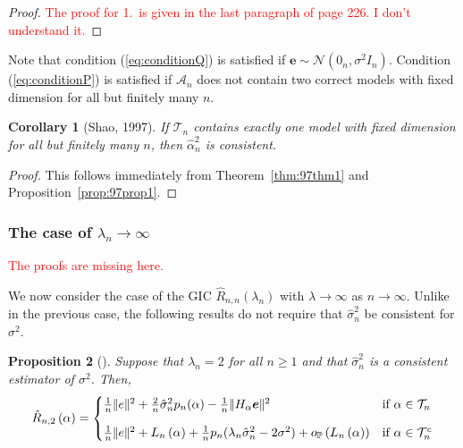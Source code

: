 \documentclass[12pt, letter paper]{article}
\newcommand{\1}{\mathmybb{1}}
\newtheorem{proposition}{Proposition}[section]
\newtheorem{corollary}[proposition]{Corollary}
\newcommand{\0}{\emptyset}
\newcommand{\prob}{\mathbb{P}}
\newcommand{\paren}[1]{\left(#1 \right)}
\newcommand{\norm}[1]{|\hspace{-1pt}|#1 |\hspace{-1pt}|}
\newcommand{\normsq}[1]{\norm{#1}^{2}}
\newcommand{\Acal}{\mathcal{A}_{n}}
\newcommand{\Tcal}{\mathcal{T}_{n}}
\newcommand{\Ncal}{\mathcal{N}}
\newcommand{\e}{\boldsymbol{e}}
\newcommand{\Loss}[1]{L_{n}\paren{#1}}
\newcommand{\Rhat}[2]{\hat{R}_{n, #1}\paren{#2}}
\newcommand{\alphahat}[1]{\hat{\alpha}^{#1}}
\newcommand{\op}[1]{o_{\prob}\paren{#1}}
\newcommand{\sigmahat}{\hat{\sigma}^{2}_{n}}
\begin{document}
\begin{proof}
    \textcolor{red}{The proof for 1.\ is given in the last paragraph of page 226. I don't understand it.}
\end{proof}

Note that condition (\ref{eq:conditionQ}) is satisfied if \(\e\sim\Ncal(0_{n}, \sigma^{2}I_{n})\). Condition (\ref{eq:conditionP}) is satisfied if \(\Acal\) does not contain two correct models with fixed dimension for all but finitely many \(n\).
\begin{corollary}[Shao, 1997]
    If \(\Tcal\) contains exactly one model with fixed dimension for all but finitely many \(n\), then \(\alphahat{2}_{n}\) is consistent.
\end{corollary}

\begin{proof}
    This follows immediately from Theorem~\ref{thm:97thm1} and Proposition~\ref{prop:97prop1}.
\end{proof}

\subsubsection{The case of \(\lambda_{n} \to \infty\)}

\textcolor{red}{The proofs are missing here.}

We now consider the case of the GIC \(\Rhat{n}{\lambda_{n}}\) with \(\lambda\to\infty\) as \(n\to \infty\). Unlike in the previous case, the following results do not require that \(\sigmahat\) be consistent for \(\sigma^{2}\).

\begin{proposition}[\cite{shao_1997}]\label{prop:97decomp2}
    Suppose that \(\lambda_{n}=2\) for all \(n\geq 1\) and that \(\sigmahat\) is a consistent estimator of \(\sigma^{2}\). Then,
    \[\Rhat{2}{\alpha} = \begin{cases}
        \frac{1}{n}\normsq{e} + \frac{2}{n}\sigmahat p_{n}(\alpha) - \frac{1}{n}\normsq{H_{\alpha}\e} &\text{if }\alpha\in\Tcal\\[3mm]
        \frac{1}{n}\normsq{e} + \Loss{\alpha} + \frac{1}{n}p_{n}(\lambda_{n}\sigmahat - 2\sigma^{2}) + \op{\Loss{\alpha}} &\text{if }\alpha\in\Tcal^{c}
    \end{cases}\]
\end{proposition}
\end{document}

